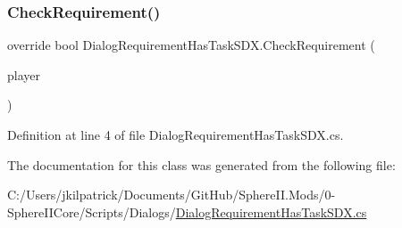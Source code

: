 \subsubsection{\texorpdfstring{CheckRequirement()}{CheckRequirement()}}
{\footnotesize\ttfamily override bool Dialog\+Requirement\+Has\+Task\+S\+D\+X.\+Check\+Requirement (\begin{DoxyParamCaption}\item[{Entity\+Player}]{player }\end{DoxyParamCaption})}



Definition at line 4 of file Dialog\+Requirement\+Has\+Task\+S\+D\+X.\+cs.



The documentation for this class was generated from the following file\+:\begin{DoxyCompactItemize}
\item 
C\+:/\+Users/jkilpatrick/\+Documents/\+Git\+Hub/\+Sphere\+I\+I.\+Mods/0-\/\+Sphere\+I\+I\+Core/\+Scripts/\+Dialogs/\mbox{\hyperlink{_dialog_requirement_has_task_s_d_x_8cs}{Dialog\+Requirement\+Has\+Task\+S\+D\+X.\+cs}}\end{DoxyCompactItemize}
